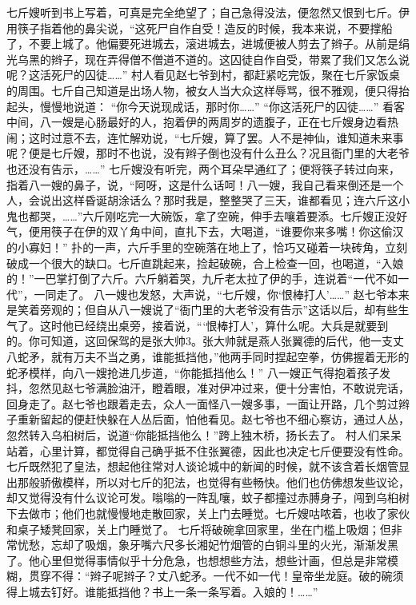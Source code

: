 \documentclass[12pt,UTF8]{ctexbook}
\begin{document}
七斤嫂听到书上写着，可真是完全绝望了；自己急得没法，便忽然又恨到七斤。伊用筷子指着他的鼻尖说，“这死尸自作自受！造反的时候，我本来说，不要撑船了，不要上城了。他偏要死进城去，滚进城去，进城便被人剪去了辫子。从前是绢光乌黑的辫子，现在弄得僧不僧道不道的。这囚徒自作自受，带累了我们又怎么说呢？这活死尸的囚徒……”
村人看见赵七爷到村，都赶紧吃完饭，聚在七斤家饭桌的周围。七斤自己知道是出场人物，被女人当大众这样辱骂，很不雅观，便只得抬起头，慢慢地说道：
“你今天说现成话，那时你……”
“你这活死尸的囚徒……”
看客中间，八一嫂是心肠最好的人，抱着伊的两周岁的遗腹子，正在七斤嫂身边看热闹；这时过意不去，连忙解劝说，“七斤嫂，算了罢。人不是神仙，谁知道未来事呢？便是七斤嫂，那时不也说，没有辫子倒也没有什么丑么？况且衙门里的大老爷也还没有告示，……”
七斤嫂没有听完，两个耳朵早通红了；便将筷子转过向来，指着八一嫂的鼻子，说，“阿呀，这是什么话呵！八一嫂，我自己看来倒还是一个人，会说出这样昏诞胡涂话么？那时我是，整整哭了三天，谁都看见；连六斤这小鬼也都哭，……”六斤刚吃完一大碗饭，拿了空碗，伸手去嚷着要添。七斤嫂正没好气，便用筷子在伊的双丫角中间，直扎下去，大喝道，“谁要你来多嘴！你这偷汉的小寡妇！”
扑的一声，六斤手里的空碗落在地上了，恰巧又碰着一块砖角，立刻破成一个很大的缺口。七斤直跳起来，捡起破碗，合上检查一回，也喝道，“入娘的！”一巴掌打倒了六斤。六斤躺着哭，九斤老太拉了伊的手，连说着“一代不如一代”，一同走了。
八一嫂也发怒，大声说，“七斤嫂，你‘恨棒打人’……”
赵七爷本来是笑着旁观的；但自从八一嫂说了“衙门里的大老爷没有告示”这话以后，却有些生气了。这时他已经绕出桌旁，接着说，“‘恨棒打人’，算什么呢。大兵是就要到的。你可知道，这回保驾的是张大帅3。张大帅就是燕人张翼德的后代，他一支丈八蛇矛，就有万夫不当之勇，谁能抵挡他，”他两手同时捏起空拳，仿佛握着无形的蛇矛模样，向八一嫂抢进几步道，“你能抵挡他么！”
八一嫂正气得抱着孩子发抖，忽然见赵七爷满脸油汗，瞪着眼，准对伊冲过来，便十分害怕，不敢说完话，回身走了。赵七爷也跟着走去，众人一面怪八一嫂多事，一面让开路，几个剪过辫子重新留起的便赶快躲在人丛后面，怕他看见。赵七爷也不细心察访，通过人丛，忽然转入乌桕树后，说道“你能抵挡他么！”跨上独木桥，扬长去了。
村人们呆呆站着，心里计算，都觉得自己确乎抵不住张翼德，因此也决定七斤便要没有性命。七斤既然犯了皇法，想起他往常对人谈论城中的新闻的时候，就不该含着长烟管显出那般骄傲模样，所以对七斤的犯法，也觉得有些畅快。他们也仿佛想发些议论，却又觉得没有什么议论可发。嗡嗡的一阵乱嚷，蚊子都撞过赤膊身子，闯到乌桕树下去做市；他们也就慢慢地走散回家，关上门去睡觉。七斤嫂咕哝着，也收了家伙和桌子矮凳回家，关上门睡觉了。
七斤将破碗拿回家里，坐在门槛上吸烟；但非常忧愁，忘却了吸烟，象牙嘴六尺多长湘妃竹烟管的白铜斗里的火光，渐渐发黑了。他心里但觉得事情似乎十分危急，也想想些方法，想些计画，但总是非常模糊，贯穿不得：“辫子呢辫子？丈八蛇矛。一代不如一代！皇帝坐龙庭。破的碗须得上城去钉好。谁能抵挡他？书上一条一条写着。入娘的！……”
\end{document}
